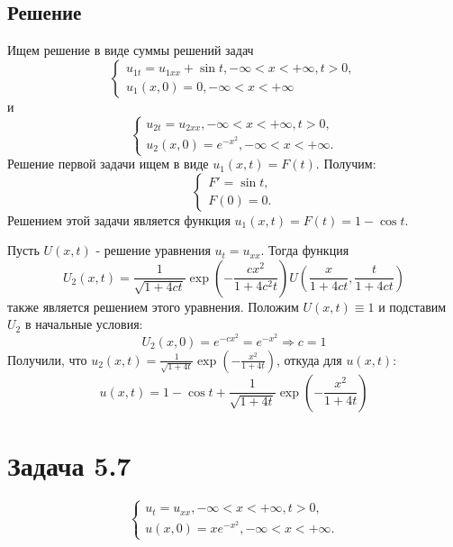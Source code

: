 \documentclass[11pt]{article}
\begin{document}
\subsection{Решение}
\label{sec:org12678bf}
Ищем решение в виде суммы решений задач
\begin{equation}
\begin{cases}
u_{1t} = u_{1xx} + \sin t, -\infty < x < +\infty, t > 0, \\
u_1(x, 0) = 0, -\infty < x < +\infty
\end{cases}
\end{equation}
и
\begin{equation}
\begin{cases}
u_{2t} = u_{2xx}, -\infty < x < +\infty, t > 0, \\
u_2(x, 0) = e^{-x^2}, -\infty < x < +\infty.
\end{cases}
\end{equation}
Решение первой задачи ищем в виде $u_1(x, t) = F(t)$. Получим:
\begin{equation}
\begin{cases}
F' = \sin t, \\
F(0) = 0.
\end{cases}
\end{equation}
Решением этой задачи является функция $u_1(x, t) = F(t) = 1 - \cos t$.

Пусть $U(x, t)$ - решение уравнения $u_t = u_{xx}$. Тогда функция
$$U_2(x, t) = \frac1{\sqrt{1 + 4ct}}\exp\left(-\frac{cx^2}{1 + 4c^2t}\right)U\left(\frac{x}{1 + 4ct}, \frac{t}{1 + 4ct}\right)$$
также является решением этого уравнения. Положим $U(x, t) \equiv 1$ и подставим $U_2$ в начальные
условия:
\begin{equation*}
U_2(x, 0) = e^{-cx^2} = e^{-x^2} \Rightarrow c = 1
\end{equation*}
Получили, что
$u_2(x, t) = \frac1{\sqrt{1 + 4t}}\exp\left(-\frac{x^2}{1 + 4t}\right)$, откуда для $u(x, t)$:
\begin{equation}
u(x, t) = 1 - \cos t + \frac1{\sqrt{1 + 4t}}\exp\left(-\frac{x^2}{1 + 4t}\right)
\end{equation}
\section{Задача 5.7}
\label{sec:org613eec0}
\begin{equation}
\begin{cases}
u_t = u_{xx}, -\infty < x < +\infty, t > 0, \\
u(x, 0) = xe^{-x^2}, -\infty < x < +\infty.
\end{cases}
\end{equation}
\end{document}
